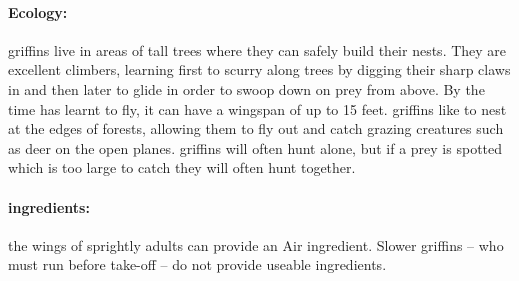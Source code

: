 \begin{multicols}{2}

\paragraph{Ecology:} \Glspl{griffin} live in areas of tall trees where they can safely build their nests.
They are excellent climbers, learning first to scurry along trees by digging their sharp claws in and then later to glide in order to swoop down on prey from above.
By the time  has learnt to fly, it can have a wingspan of up to 15 feet.
\Glspl{griffin} like to nest at the edges of forests, allowing them to fly out and catch grazing creatures such as deer on the open planes.
\Glspl{griffin} will often hunt alone, but if a prey is spotted which is too large to catch  they will often hunt together.

\paragraph{\Glspl{ingredient}:}
the wings of sprightly adults can provide an Air \gls{ingredient}.
Slower \glspl{griffin} -- who must run before take-off -- do not provide useable \glspl{ingredient}.

\showEnc


\end{multicols}
